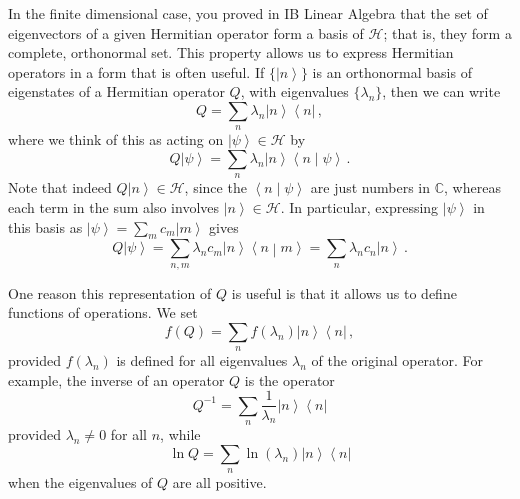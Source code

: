 \documentclass{article}
\theoremstyle{plain}\theoremheaderfont{\normalfont\itshape}\theorembodyfont{\rmfamily}\theoremseparator{.}\newtheorem*{rem}{Remark}\newtheorem*{ex}{Example}\newtheorem*{proof}{Proof}\newtheorem*{altp}{Alternative proof}
\theoremstyle{plain}\theoremheaderfont{\normalfont\bfseries}\theorembodyfont{\rmfamily}\theoremseparator{.}\newtheorem{thm}{Theorem}[section]\newtheorem{lem}[thm]{Lemma}\newtheorem{prop}[thm]{Proposition}\newtheorem*{cor}{Corollary}\newtheorem{defn}[thm]{Definition}\newtheorem{clm}[thm]{Claim}\newtheorem{clminproof}{Claim}
\theoremstyle{break}\theoremheaderfont{\normalfont\itshape}\theorembodyfont{\rmfamily}\theoremseparator{.\medskip}\newtheorem*{proofskip}{Proof}\newtheorem*{exs}{Examples}\newtheorem*{rems}{Remarks}
\theoremstyle{break}\theoremheaderfont{\normalfont\bfseries}\theorembodyfont{\rmfamily}\theoremseparator{.\medskip}\newtheorem{lemskip}[thm]{Lemma}\newtheorem{defnskip}[thm]{Definition}\newtheorem{propskip}[thm]{Proposition}\newtheorem{thmskip}[thm]{Theorem}
\numberwithin{equation}{section}
\newcommand{\bra}[1]{\left\langle #1 \right|}
\newcommand{\ket}[1]{\left| #1 \right\rangle}
\newcommand{\braket}[2]{\left\langle #1 \middle| #2 \right\rangle}
\newcommand{\hb}{\mathcal{H}}
\newcommand{\CC}{\mathbb{C}}
\begin{document}
    In the finite dimensional case, you proved in IB Linear Algebra that the set of eigenvectors of a given Hermitian operator form a basis of \(\hb\); that is, they form a complete, orthonormal set. This property allows us to express Hermitian operators in a form that is often useful. If \(\{\ket{n}\}\) is an orthonormal basis of eigenstates of a Hermitian operator \(Q\), with eigenvalues \(\{\lambda_n\}\), then we can write
    \begin{equation}
        Q=\sum_n\lambda_n\ket{n}\bra{n}\,,
    \end{equation}
    where we think of this as acting on \(\ket{\psi}\in\hb\) by
    \begin{equation}
        Q\ket{\psi}=\sum_n \lambda_n \ket{n}\braket{n}{\psi}\,.
    \end{equation}
    Note that indeed \(Q\ket{n}\in\hb\), since the \(\braket{n}{\psi}\) are just numbers in \(\CC\), whereas each term in the sum also involves \(\ket{n}\in\hb\). In particular, expressing \(\ket{\psi}\) in this basis as \(\ket{\psi}=\sum_m c_m\ket{m}\) gives
    \begin{equation}
        Q\ket{\psi}=\sum_{n,m}\lambda_n c_m\ket{n}\braket{n}{m}=\sum_n \lambda_n c_n\ket{n}\,.
    \end{equation}

    One reason this representation of \(Q\) is useful is that it allows us to define functions of operations. We set
    \begin{equation}\label{function_of_operator}
        f(Q)=\sum_n f(\lambda_n)\ket{n}\bra{n}\,,
    \end{equation}
    provided \(f(\lambda_n)\) is defined for all eigenvalues \(\lambda_n\) of the original operator. For example, the inverse of an operator \(Q\) is the operator
    \begin{equation}
        Q^{-1}=\sum_n \frac{1}{\lambda_n}\ket{n}\bra{n}
    \end{equation}
    provided \(\lambda_n\ne 0\) for all \(n\), while
    \begin{equation}
        \ln Q=\sum_n\ln(\lambda_n)\ket{n}\bra{n}
    \end{equation}
    when the eigenvalues of \(Q\) are all positive.
\end{document}

